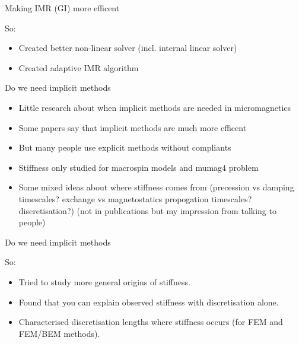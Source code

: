 \documentclass[18pt]{beamer}
\newlength{\wideitemsep}
\let\olditem\item
\renewcommand{\item}{\setlength{\itemsep}{\wideitemsep}\olditem}
\begin{document}
\begin{frame}{Making IMR (GI) more efficent}

  So:
  \begin{itemize}
  \item Created better non-linear solver (incl. internal linear solver)
  \item Created adaptive IMR algorithm
  \end{itemize} 
  
\end{frame}


\begin{frame}{Do we need implicit methods}

  \begin{itemize}
  \item Little research about when implicit methods are needed in micromagnetics
  \item Some papers say that implicit methods are much more efficent
  \item But many people use explicit methods without compliants
  \item Stiffness only studied for macrospin models and mumag4 problem
  \item Some mixed ideas about where stiffness comes from (precession vs
    damping timescales? exchange vs magnetostatics propogation timescales?
    discretisation?) (not in publications but my impression from talking
    to people)
  \end{itemize}

\end{frame}

\begin{frame}{Do we need implicit methods }

  So:
  \begin{itemize}
  \item Tried to study more general origins of stiffness.
  \item Found that you can explain observed stiffness with discretisation
    alone.
  \item Characterised discretisation lengths where stiffness occurs (for
    FEM and FEM/BEM methods).
  \end{itemize} 
  
\end{frame}
\end{document}
